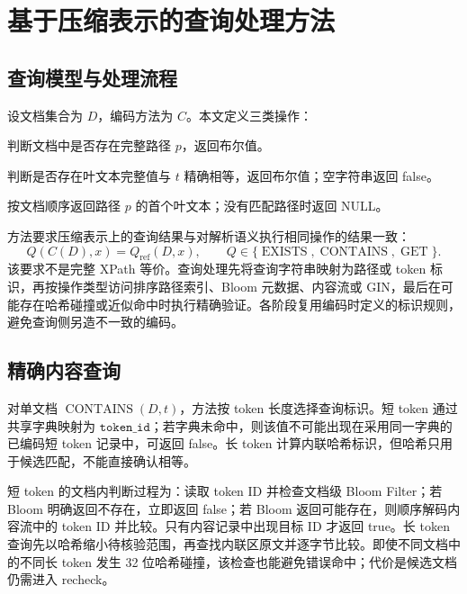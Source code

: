 \chapter{基于压缩表示的查询处理方法}

\section{查询模型与处理流程}

设文档集合为 $D$，编码方法为 $C$。本文定义三类操作：
\begin{description}[leftmargin=3.2cm,style=nextline]
  \item[路径存在 $\operatorname{EXISTS}(D,p)$] 判断文档中是否存在完整路径 $p$，返回布尔值。
  \item[精确内容 $\operatorname{CONTAINS}(D,t)$] 判断是否存在叶文本完整值与 $t$ 精确相等，返回布尔值；空字符串返回 false。
  \item[路径取值 $\operatorname{GET}(D,p)$] 按文档顺序返回路径 $p$ 的首个叶文本；没有匹配路径时返回 NULL。
\end{description}

方法要求压缩表示上的查询结果与对解析语义执行相同操作的结果一致：
\[
Q(C(D),x)=Q_{\mathrm{ref}}(D,x),\qquad
Q\in\{\operatorname{EXISTS},\operatorname{CONTAINS},\operatorname{GET}\}.
\]
该要求不是完整 XPath 等价。查询处理先将查询字符串映射为路径或 token 标识，再按操作类型访问排序路径索引、Bloom 元数据、内容流或 GIN，最后在可能存在哈希碰撞或近似命中时执行精确验证。各阶段复用编码时定义的标识规则，避免查询侧另造不一致的编码。

\section{精确内容查询}

对单文档 $\operatorname{CONTAINS}(D,t)$，方法按 token 长度选择查询标识。短 token 通过共享字典映射为 $\texttt{token\_id}$；若字典未命中，则该值不可能出现在采用同一字典的已编码短 token 记录中，可返回 false。长 token 计算内联哈希标识，但哈希只用于候选匹配，不能直接确认相等。

短 token 的文档内判断过程为：读取 token ID 并检查文档级 Bloom Filter；若 Bloom 明确返回不存在，立即返回 false；若 Bloom 返回可能存在，则顺序解码内容流中的 token ID 并比较。只有内容记录中出现目标 ID 才返回 true。长 token 查询先以哈希缩小待核验范围，再查找内联区原文并逐字节比较。即使不同文档中的不同长 token 发生 32 位哈希碰撞，该检查也能避免错误命中；代价是候选文档仍需进入 recheck。

